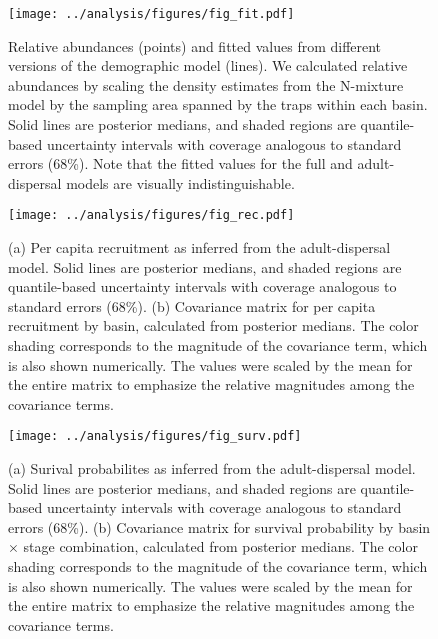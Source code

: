 \documentclass[11pt]{article}
\begin{document}
\clearpage
\begin{figure}
\centering
\texttt{[image: ../analysis/figures/fig\_fit.pdf]}
\caption{\label{fig:fit}
Relative abundances (points) and fitted values from different versions 
of the demographic model (lines).
We calculated relative abundances by scaling the density estimates from the 
N-mixture model by the sampling area spanned by the traps within each basin. 
Solid lines are posterior medians,
and shaded regions are quantile-based uncertainty intervals
with coverage analogous to standard errors (68\%).
Note that the fitted values for the full and adult-dispersal models 
are visually indistinguishable.
}
\end{figure}
\clearpage

\clearpage
\begin{figure}
\centering
\texttt{[image: ../analysis/figures/fig\_rec.pdf]}
\caption{\label{fig:rec}
(a) Per capita recruitment as inferred from the adult-dispersal model.
Solid lines are posterior medians,
and shaded regions are quantile-based uncertainty intervals
with coverage analogous to standard errors (68\%).
(b) Covariance matrix for per capita recruitment by basin,
calculated from posterior medians.
The color shading corresponds to the magnitude of the covariance term,
which is also shown numerically. 
The values were scaled by the mean for the entire matrix to emphasize 
the relative magnitudes among the covariance terms.
}
\end{figure}
\clearpage

\clearpage
\begin{figure}
\centering
\texttt{[image: ../analysis/figures/fig\_surv.pdf]}
\caption{\label{fig:surv}
(a) Surival probabilites as inferred from the adult-dispersal model.
Solid lines are posterior medians,
and shaded regions are quantile-based uncertainty intervals
with coverage analogous to standard errors (68\%).
(b) Covariance matrix for survival probability by basin $\times$ stage combination,
calculated from posterior medians.
The color shading corresponds to the magnitude of the covariance term,
which is also shown numerically. 
The values were scaled by the mean for the entire matrix to emphasize 
the relative magnitudes among the covariance terms.
}
\end{figure}
\clearpage
\end{document}
